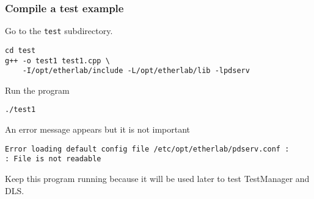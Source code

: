 \subsubsection{Compile a test example}
\label{test-server-for-testmanager}
Go to the \texttt{test} subdirectory.

\begin{verbatim}
cd test
g++ -o test1 test1.cpp \
    -I/opt/etherlab/include -L/opt/etherlab/lib -lpdserv
\end{verbatim}

Run the program
\begin{verbatim}
./test1
\end{verbatim}

\noindent An error message appears but it is not important
\begin{verbatim}
Error loading default config file /etc/opt/etherlab/pdserv.conf :
: File is not readable
\end{verbatim}

Keep this program running because it will be used later to test
TestManager and DLS.

